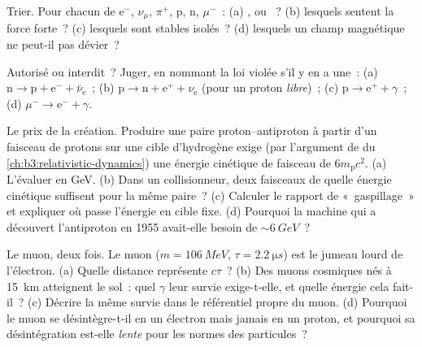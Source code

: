 \begin{exercise}[$\star$]\label{exo:b3:particle-physics:2}
Trier. Pour chacun de e$^-$, $\nu_\mu$, $\pi^+$, p, n,
$\mu^-$~: (a) ,  ou ~? (b) lesquels sentent la force
forte~? (c) lesquels sont stables isolés~? (d) lesquels un champ
magnétique ne peut-il pas dévier~?
\end{exercise}

\begin{exercise}[$\star$]\label{exo:b3:particle-physics:3}
Autorisé ou interdit~? Juger, en nommant la loi violée s'il y en a
une~:
(a) $\text{n} \to \text{p} + \text{e}^- + \bar\nu_{\text{e}}$~;
(b) $\text{p} \to \text{n} + \text{e}^+ + \nu_{\text{e}}$ (pour un
proton \emph{libre})~;
(c) $\text{p} \to \text{e}^+ + \gamma$~;
(d) $\mu^- \to \text{e}^- + \gamma$.
\end{exercise}

\begin{exercise}[$\star$]\label{exo:b3:particle-physics:4}
Le prix de la création. Produire une paire proton--antiproton à
partir d'un faisceau de protons sur une cible d'hydrogène exige (par
l'argument de  du
\cref{ch:b3:relativistic-dynamics}) une énergie cinétique de faisceau
de $6m_{\text{p}}c^2$. (a) L'évaluer en GeV. (b) Dans un
collisionneur, deux faisceaux de quelle énergie cinétique suffisent
pour la même paire~? (c) Calculer le rapport de «~gaspillage~» et
expliquer où passe l'énergie en cible fixe. (d) Pourquoi la machine
qui a découvert l'antiproton en 1955 avait-elle besoin de
$\sim\qty{6}{GeV}$~?
\end{exercise}

\begin{exercise}[$\star\star$]\label{exo:b3:particle-physics:5}
Le muon, deux fois. Le muon ($m = \qty{106}{MeV}$,
$\tau = \qty{2.2}{\micro s}$) est le jumeau lourd de l'électron. (a)
Quelle distance représente $c\tau$~? (b) Des muons cosmiques nés à
\qty{15}{km} atteignent le sol~: quel $\gamma$ leur survie
exige-t-elle, et quelle énergie cela fait-il~? (c) Décrire la même
survie dans le référentiel propre du muon. (d) Pourquoi le muon se
désintègre-t-il en un électron mais jamais en un proton, et pourquoi
sa désintégration est-elle \emph{lente} pour les normes des
particules~?
\end{exercise}

